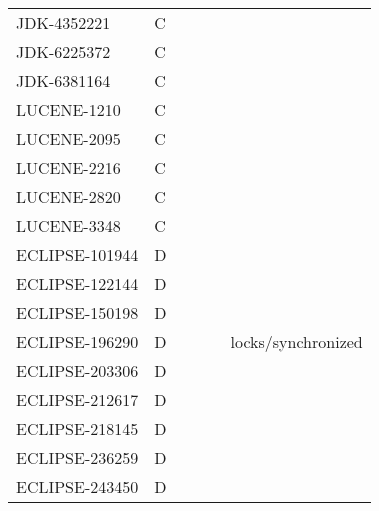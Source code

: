 \begin{table}[!htp]
{\begin{tabular}{lllll}
    JDK-4352221    & C        & ~             & ~               & ~                                           \\
    JDK-6225372    & C        & ~             & ~               & ~                                           \\
    JDK-6381164    & C        & ~             & ~               & ~                                           \\
    LUCENE-1210    & C        & ~             & ~               & ~                                           \\
    LUCENE-2095    & C        & ~             & ~               & ~                                           \\
    LUCENE-2216    & C        & ~             & ~               & ~                                           \\
    LUCENE-2820    & C        & ~             & ~               & ~                                           \\
    LUCENE-3348    & C        & ~             & ~               & ~                                           \\
    ECLIPSE-101944 & D        & ~             & ~               & ~                                           \\
    ECLIPSE-122144 & D        & ~             & ~               & ~                                           \\
    ECLIPSE-150198 & D        & ~             & ~               & ~                                           \\
    ECLIPSE-196290 & D        & ~             & ~               & locks/synchronized                          \\
    ECLIPSE-203306 & D        & ~             & ~               & ~                                           \\
    ECLIPSE-212617 & D        & ~             & ~               & ~                                           \\
    ECLIPSE-218145 & D        & ~             & ~               & ~                                           \\
    ECLIPSE-236259 & D        & ~             & ~               & ~                                           \\
    ECLIPSE-243450 & D        & ~             & ~               & ~                                           \\

\end{tabular}}
\end{table}
